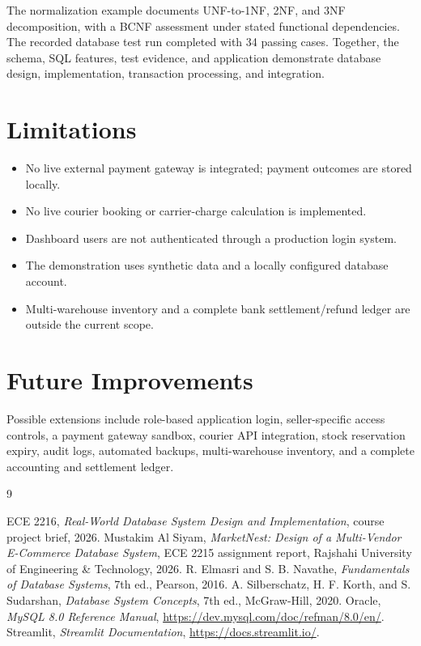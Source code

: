 \documentclass[11pt,a4paper,oneside]{report}
\begin{document}
The normalization example documents UNF-to-1NF, 2NF, and 3NF decomposition, with a BCNF assessment under stated functional dependencies. The recorded database test run completed with 34 passing cases. Together, the schema, SQL features, test evidence, and application demonstrate database design, implementation, transaction processing, and integration.

\section{Limitations}
\begin{itemize}
 \item No live external payment gateway is integrated; payment outcomes are stored locally.
 \item No live courier booking or carrier-charge calculation is implemented.
 \item Dashboard users are not authenticated through a production login system.
 \item The demonstration uses synthetic data and a locally configured database account.
 \item Multi-warehouse inventory and a complete bank settlement/refund ledger are outside the current scope.
\end{itemize}

\section{Future Improvements}
Possible extensions include role-based application login, seller-specific access controls, a payment gateway sandbox, courier API integration, stock reservation expiry, audit logs, automated backups, multi-warehouse inventory, and a complete accounting and settlement ledger.

\renewcommand{\bibname}{References}
\begin{thebibliography}{9}
 ECE 2216, \textit{Real-World Database System Design and Implementation}, course project brief, 2026.
 Mustakim Al Siyam, \textit{MarketNest: Design of a Multi-Vendor E-Commerce Database System}, ECE 2215 assignment report, Rajshahi University of Engineering \& Technology, 2026.
 R. Elmasri and S. B. Navathe, \textit{Fundamentals of Database Systems}, 7th ed., Pearson, 2016.
 A. Silberschatz, H. F. Korth, and S. Sudarshan, \textit{Database System Concepts}, 7th ed., McGraw-Hill, 2020.
 Oracle, \textit{MySQL 8.0 Reference Manual}, \url{https://dev.mysql.com/doc/refman/8.0/en/}.
 Streamlit, \textit{Streamlit Documentation}, \url{https://docs.streamlit.io/}.
\end{thebibliography}
\end{document}

